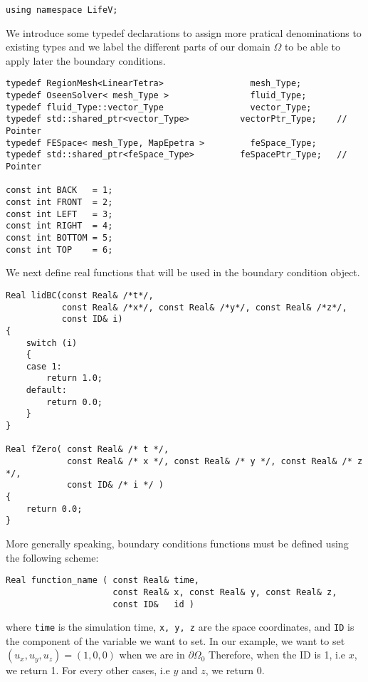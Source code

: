 \begin{verbatim}
using namespace LifeV;
\end{verbatim}

We introduce some typedef declarations to assign more pratical denominations to existing types and we label the different parts of our domain $\Omega$ to be able to apply later the boundary conditions.

\begin{verbatim}
typedef RegionMesh<LinearTetra>                 mesh_Type;
typedef OseenSolver< mesh_Type >                fluid_Type;
typedef fluid_Type::vector_Type                 vector_Type;
typedef std::shared_ptr<vector_Type>          vectorPtr_Type;    // Pointer
typedef FESpace< mesh_Type, MapEpetra >         feSpace_Type;
typedef std::shared_ptr<feSpace_Type>         feSpacePtr_Type;   // Pointer

const int BACK   = 1;
const int FRONT  = 2;
const int LEFT   = 3;
const int RIGHT  = 4;
const int BOTTOM = 5;
const int TOP    = 6;
\end{verbatim}



We next define real functions that will be used in the boundary condition
object.


\begin{verbatim}
Real lidBC(const Real& /*t*/,
           const Real& /*x*/, const Real& /*y*/, const Real& /*z*/,
           const ID& i)
{
    switch (i)
    {
    case 1:
        return 1.0;
    default:
        return 0.0;
    }
}

Real fZero( const Real& /* t */,
            const Real& /* x */, const Real& /* y */, const Real& /* z */,
            const ID& /* i */ )
{
    return 0.0;
}
\end{verbatim}

More generally speaking, boundary conditions functions must be defined using the following scheme:

\begin{verbatim}
Real function_name ( const Real& time,
                     const Real& x, const Real& y, const Real& z,
                     const ID&   id )
\end{verbatim}
\noindent where
\verb|time|
is the simulation time,
\verb|x, y, z|
are the space coordinates, and
\verb|ID|
is the component of the variable we want to set.
In our example, we want to set $(u_x, u_y, u_z) = (1, 0, 0)$ when we are in ${\partial \Omega}_0$
Therefore, when the ID is 1, i.e $x$, we return 1. For every other cases, i.e $y$ and $z$,
we return 0.\\

